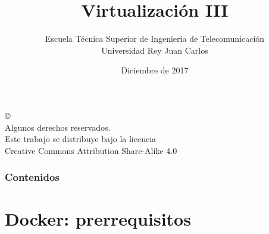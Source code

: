 \documentclass[ucs]{beamer}
\begin{document}
\title[Virtualización III]{Virtualización III}

\author[GSyC]{Escuela Técnica Superior de Ingeniería de Telecomunicación\\
Universidad Rey Juan Carlos}
\date[2017]{Diciembre de 2017}



\begin{frame}
  \titlepage
\end{frame}



\begin{frame}[b]
\begin{flushright}
{\tiny
\copyright \insertshortdate~\insertshortauthor \\
  Algunos derechos reservados. \\
  Este trabajo se distribuye bajo la licencia \\
  Creative Commons Attribution Share-Alike 4.0\\
}
\end{flushright}  
\end{frame}



\begin{frame}
  \frametitle{Contenidos}

  \tableofcontents

\end{frame}


\section{Docker: prerrequisitos}
\end{document}
